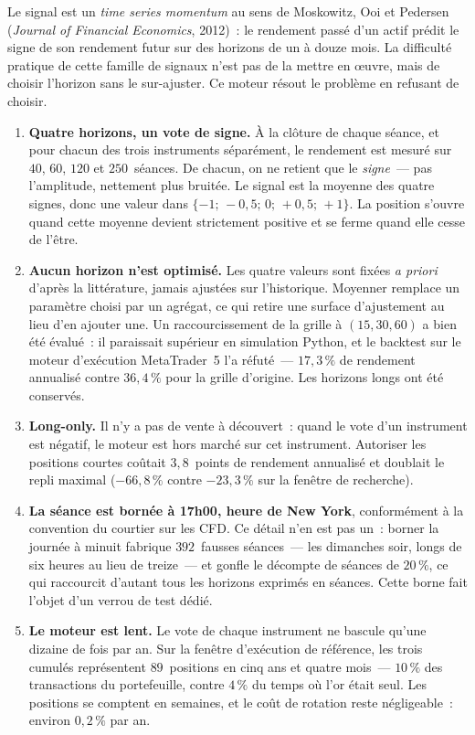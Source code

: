 Le signal est un \emph{time series momentum} au sens de Moskowitz, Ooi et Pedersen (\emph{Journal of Financial Economics}, 2012)~: le rendement passé d'un actif prédit le signe de son rendement futur sur des horizons de un à douze mois. La difficulté pratique de cette famille de signaux n'est pas de la mettre en \oe uvre, mais de choisir l'horizon sans le sur-ajuster. Ce moteur résout le problème en refusant de choisir.

\begin{enumerate}
\item \textbf{Quatre horizons, un vote de signe.} À la clôture de chaque séance, et pour chacun des trois instruments séparément, le rendement est mesuré sur $40$, $60$, $120$ et $250$~séances. De chacun, on ne retient que le \emph{signe}~--- pas l'amplitude, nettement plus bruitée. Le signal est la moyenne des quatre signes, donc une valeur dans $\{-1;\,-0{,}5;\,0;\,+0{,}5;\,+1\}$. La position s'ouvre quand cette moyenne devient strictement positive et se ferme quand elle cesse de l'être.

\item \textbf{Aucun horizon n'est optimisé.} Les quatre valeurs sont fixées \emph{a priori} d'après la littérature, jamais ajustées sur l'historique. Moyenner remplace un paramètre choisi par un agrégat, ce qui retire une surface d'ajustement au lieu d'en ajouter une. Un raccourcissement de la grille à $(15,30,60)$ a bien été évalué~: il paraissait supérieur en simulation Python, et le backtest sur le moteur d'exécution MetaTrader~5 l'a réfuté~--- $17{,}3\,\%$ de rendement annualisé contre $36{,}4\,\%$ pour la grille d'origine. Les horizons longs ont été conservés.

\item \textbf{Long-only.} Il n'y a pas de vente à découvert~: quand le vote d'un instrument est négatif, le moteur est hors marché sur cet instrument. Autoriser les positions courtes coûtait $3{,}8$~points de rendement annualisé et doublait le repli maximal ($-66{,}8\,\%$ contre $-23{,}3\,\%$ sur la fenêtre de recherche).

\item \textbf{La séance est bornée à 17h00, heure de New York}, conformément à la convention du courtier sur les CFD. Ce détail n'en est pas un~: borner la journée à minuit fabrique $392$~fausses séances~--- les dimanches soir, longs de six heures au lieu de treize~--- et gonfle le décompte de séances de $20\,\%$, ce qui raccourcit d'autant tous les horizons exprimés en séances. Cette borne fait l'objet d'un verrou de test dédié.

\item \textbf{Le moteur est lent.} Le vote de chaque instrument ne bascule qu'une dizaine de fois par an. Sur la fenêtre d'exécution de référence, les trois cumulés représentent $89$~positions en cinq ans et quatre mois~--- $10\,\%$ des transactions du portefeuille, contre $4\,\%$ du temps où l'or était seul. Les positions se comptent en semaines, et le coût de rotation reste négligeable~: environ $0{,}2\,\%$ par an.
\end{enumerate}

